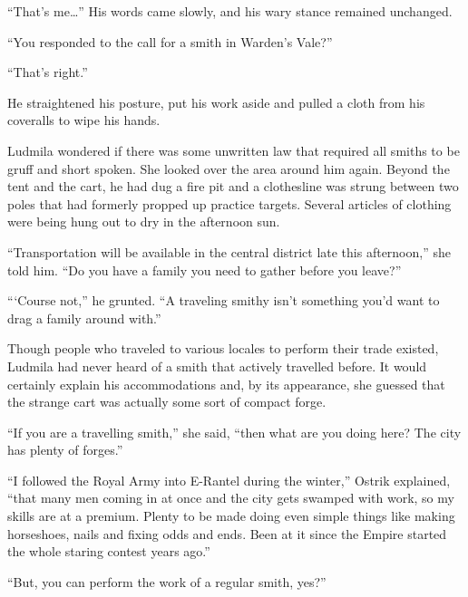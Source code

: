  

“That’s me…” His words came slowly, and his wary stance remained unchanged.

 

“You responded to the call for a smith in Warden’s Vale?”

 

“That’s right.”

 

He straightened his posture, put his work aside and pulled a cloth from his coveralls to wipe his hands.

 

Ludmila wondered if there was some unwritten law that required all smiths to be gruff and short spoken. She looked over the area around him again. Beyond the tent and the cart, he had dug a fire pit and a clothesline was strung between two poles that had formerly propped up practice targets. Several articles of clothing were being hung out to dry in the afternoon sun.

 

“Transportation will be available in the central district late this afternoon,” she told him. “Do you have a family you need to gather before you leave?”

 

“‘Course not,” he grunted. “A traveling smithy isn’t something you’d want to drag a family around with.”

 

Though people who traveled to various locales to perform their trade existed, Ludmila had never heard of a smith that actively travelled before. It would certainly explain his accommodations and, by its appearance, she guessed that the strange cart was actually some sort of compact forge.

 

“If you are a travelling smith,” she said, “then what are you doing here? The city has plenty of forges.”

 

“I followed the Royal Army into E-Rantel during the winter,” Ostrik explained, “that many men coming in at once and the city gets swamped with work, so my skills are at a premium. Plenty to be made doing even simple things like making horseshoes, nails and fixing odds and ends. Been at it since the Empire started the whole staring contest years ago.”

 

“But, you can perform the work of a regular smith, yes?”

